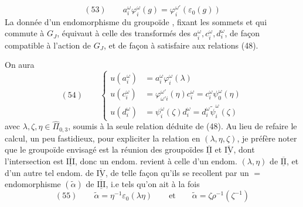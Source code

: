 \[
(53)\qquad a_i^\omega\varphi_i^\omega(g)=\varphi_i^{\omega'}(\varepsilon_0(g))
\]
La donnée d'un endomorphisme du groupoïde , fixant les sommets et qui commute à $G_J$, équivaut à celle des  transformés des $a_i^\omega,c_i^\omega,d_i^\omega$, de façon  compatible à l'action de $G_J$, et de façon à satisfaire aux relations (48).

On aura
\[
(54)\qquad\left\{\begin{aligned}
u(a_i^\omega)&=a_i^\omega\varphi_i^\omega(\lambda)\\
u(c_i^\omega)&=\varphi_{\omega'i}^{\omega'}(\eta)c_i^\omega=c_i^\omega\psi_{0}^\omega(\eta)\\
u(d_i^\omega)&=\psi_i^\omega(\zeta)d_i^\omega=d_i^\omega\widetilde\psi_i^\omega(\zeta)
\end{aligned}\right.
\]
avec $\lambda,\zeta,\eta\in\widehat\Pi_{0,3}$, soumis à la seule relation déduite de (48). Au lieu de refaire le calcul, un peu fastidieux, pour expliciter la relation en $(\lambda,\eta,\zeta)$, je préfère noter que le  groupoïde envisagé est la réunion des groupoïdes $\overline{\underline{\mathrm{II}}}$ et $\overline{\underline{\mathrm{IV}}}$, dont l'intersection est $\overline{\underline{\mathrm{III}}}$, donc un endom.  revient à celle d'un  endom. $(\lambda,\eta)$ de $\overline{\underline{\mathrm{II}}}$, et d'un autre tel endom. \inserted{$\zeta$} de $\overline{\underline{\mathrm{IV}}}$, de telle façon qu'ils se recollent  par un $=$ endomorphisme $(\widetilde\alpha)$ de $\overline{\underline{\mathrm{III}}}$, i.e tels qu'on ait à la fois
\[
(55)\qquad\widetilde\alpha=\eta^{-1}\varepsilon_0(\lambda\eta)\qquad\text{et}\qquad
\widetilde\alpha=\zeta\rho^{-1}(\zeta^{-1})
\]
